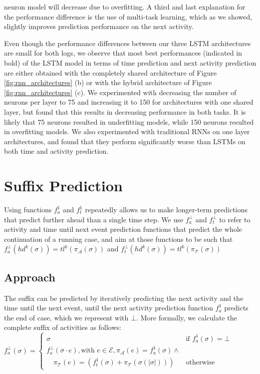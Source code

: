 \documentclass[runningheads,a4paper]{llncs}
\begin{document}
neuron model will decrease due to overfitting. A third and last explanation for the performance difference is the use of multi-task learning, which as we showed, slightly improves prediction performance on the next activity.

Even though the performance differences between our three LSTM architectures are small for both logs, we observe that most best performances (indicated in bold) of the LSTM model in terms of time prediction and next activity prediction are either obtained with the completely shared architecture of Figure \ref{fig:rnn_architectures} (b) or with the hybrid architecture of Figure \ref{fig:rnn_architectures} (c). We experimented with decreasing the number of neurons per layer to 75 and increasing it to 150 for architectures with one shared layer, but found that this results in decreasing performance in both tasks. It is likely that 75 neurons resulted in underfitting models, while 150 neurons resulted in overfitting models. We also experimented with traditional RNNs on one layer architectures, and found that they perform significantly worse than LSTMs on both time and activity prediction. 
\section{Suffix Prediction}
\label{sec:full_suffix}
\enlargethispage{\baselineskip}
Using functions $f_a^1$ and $f_t^1$ repeatedly allows us to make longer-term predictions that predict further ahead than a single time step. We use $f_a^\bot$ and $f_t^\bot$ to refer to activity and time until next event prediction functions that predict the whole continuation of a running case, and aim at those functions to be such that $f_a^\bot(\mathit{hd}^k(\sigma))=\mathit{tl}^k(\pi_\mathcal{A}(\sigma))$ and $f_t^\bot(\mathit{hd}^k(\sigma))=\mathit{tl}^k(\pi_\mathcal{T}(\sigma))$
\subsection{Approach}
The suffix can be predicted by iteratively predicting the next activity and the time until the next event, until the next activity prediction function $f_a^1$ predicts the end of case, which we represent with $\bot$. More formally, we calculate the complete suffix of activities as follows:\\
$f_{a}^\bot(\sigma)= \begin{cases}
\sigma & \mbox{if } f_{a}^1(\sigma)=\bot \\
f_{a}^\bot(\sigma\cdot e), \text{with } e\in\mathcal{E},\pi_\mathcal{A}(e)=f_a^1(\sigma)\land\\\quad\pi_\mathcal{T}(e)=(f_t^1(\sigma)+\pi_\mathcal{T}(\sigma(|\sigma|))) & \mbox{otherwise}
\end{cases}$
\end{document}
